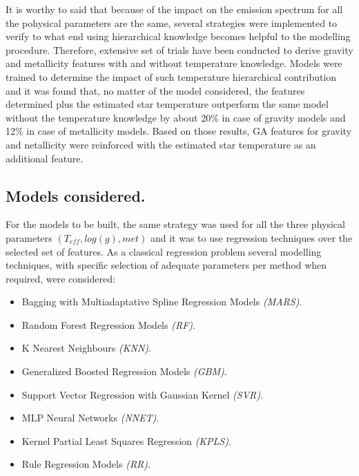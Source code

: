 It is worthy to said that because of the impact on the emission spectrum 
for all the pohysical parameters are the same, several strategies were 
implemented to verify to what end using hierarchical knowledge becomes
helpful to the modelling procedure. Therefore, extensive set of trials 
have been conducted to derive gravity and metallicity features with and
without temperature knowledge. Models were trained to determine the impact of
such temperature hierarchical contribution and it was found that, 
no matter of the model considered, the features determined plus the 
estimated star temperature outperform the same model without the 
temperature knowledge by about 20\% in case of gravity models and 12\%
in case of metallicity models.
Based on those results, GA features for gravity and netallicity were 
reinforced with the estimated star temperature as an additional feature.


\subsection{Models considered.}
\label {ssub:models}
For the models to be built, the same strategy was used for all the
three physical parameters $(T_{eff}, log(g), met)$ and it was to use
regression techniques over the selected set of features.  
As a classical regression problem several modelling techniques, with
specific selection of adequate parameters per method when required,
were considered: 

\begin{itemize}
 \item {Bagging with Multiadaptative Spline Regression Models \emph{(MARS)}.}
 \item {Random Forest Regression Models \emph{(RF)}.} 
 \item {K Nearest Neighbours \emph{(KNN)}.}
 \item {Generalized Boosted Regression Models \emph{(GBM)}.}
 \item {Support Vector Regression with Gaussian Kernel \emph{(SVR)}.}
 \item {MLP Neural Networks \emph{(NNET)}.}
 \item {Kernel Partial Least Squares Regression \emph{(KPLS)}.}
 \item {Rule Regression Models \emph{(RR)}.} 
 \end{itemize}


